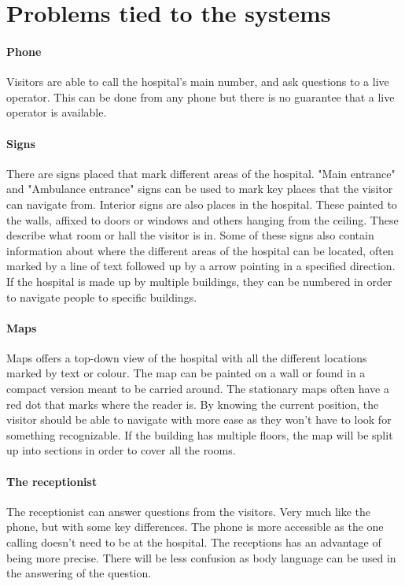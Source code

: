 \section{Problems tied to the systems} %
\label{sec:Problems_tied_to_the_systems}

\paragraph{Phone}
Visitors are able to call the hospital's main number, and ask questions to a live operator. This can be done from any phone but there is no guarantee that a live operator is available.

\paragraph{Signs}
There are signs placed that mark different areas of the hospital. "Main entrance" and "Ambulance entrance" signs can be used to mark key places that the visitor can navigate from\cite{art_Osborne}.
Interior signs are also places in the hospital. These painted to the walls, affixed to doors or windows and others hanging from the ceiling. These describe what room or hall the visitor is in. Some of these signs also contain information about where the different areas of the hospital can be located, often marked by a line of text followed up by a arrow pointing in a specified direction. If the hospital is made up by multiple buildings, they can be numbered in order to navigate people to specific buildings.

\paragraph{Maps}
Maps offers a top-down view of the hospital with all the different locations marked by text or colour\cite{art_Osborne}. The map can be painted on a wall or found in a compact version meant to be carried around. The stationary maps often have a red dot that marks where the reader is. By knowing the current position, the visitor should be able to navigate with more ease as they won't have to look for something recognizable. If the building has multiple floors, the map will be split up into sections in order to cover all the rooms.

\paragraph{The receptionist}
The receptionist can answer questions from the visitors. Very much like the phone, but with some key differences. The phone is more accessible as the one calling doesn't need to be at the hospital. The receptions has an advantage of being more precise. There will be less confusion as body language can be used in the answering of the question.


